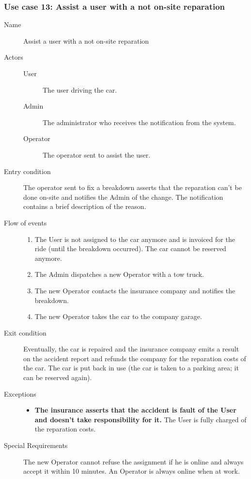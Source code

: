 	\subsubsection{Use case 13: Assist a user with a not on-site reparation}
		\begin{description}
			\item[Name] Assist a user with a not on-site reparation
			\item[Actors] \hfill
			\begin{description}
				\item[User] The user driving the car.
				\item[Admin] The administrator who receives the notification from the system.
				\item[Operator] The operator sent to assist the user.
			\end{description}
			\item[Entry condition] The operator sent to fix a breakdown asserts that the reparation can't be done on-site and notifies the Admin of the change. The notification contains a brief description of the reason.
			\item[Flow of events] \hfill
			\begin{enumerate}
				\item The User is not assigned to the car anymore and is invoiced for the ride (until the breakdown occurred). The car cannot be reserved anymore.
				\item The Admin dispatches a new Operator with a tow truck.
				\item The new Operator contacts the insurance company and notifies the breakdown.
				\item The new Operator takes the car to the company garage.
			\end{enumerate}
			\item[Exit condition] Eventually, the car is repaired and the insurance company emits a result on the accident report and refunds the company for the reparation costs of the car. The car is put back in use (the car is taken to a parking area; it can be reserved again).
			\item[Exceptions] \hfill
			\begin{itemize}
				\item \textbf{The insurance asserts that the accident is fault of the User and doesn't take responsibility for it.} The User is fully charged of the reparation costs.
			\end{itemize}
			\item[Special Requirements] The new Operator cannot refuse the assignment if he is online and always accept it within 10 minutes. An Operator is always online when at work.
		\end{description}
